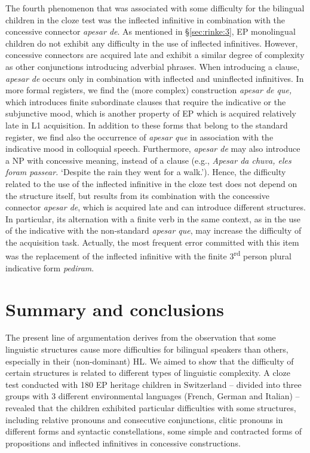 \documentclass[output=paper]{langscibook}
\begin{document}
The fourth phenomenon that was associated with some difficulty for the bilingual children in the cloze test was the inflected infinitive in combination with the concessive connector \textit{apesar de}. As mentioned in \S \ref{sec:rinke:3}, EP monolingual children do not exhibit any difficulty in the use of inflected infinitives. However, concessive connectors are acquired late and exhibit a similar degree of complexity as other conjunctions introducing adverbial phrases. When introducing a clause, \textit{apesar de} occurs only in combination with inflected and uninflected infinitives. In more formal registers, we find the (more complex) construction \textit{apesar de que,} which introduces finite subordinate clauses that require the indicative or the subjunctive mood, which is another property of EP which is acquired relatively late in L1 acquisition. In addition to these forms that belong to the standard register, we find also the occurrence of \textit{apesar que} in association with the indicative mood in colloquial speech. Furthermore, \textit{apesar de} may also introduce a NP with concessive meaning, instead of a clause (e.g., \textit{Apesar da chuva, eles foram passear.} `Despite the rain they went for a walk.'). Hence, the difficulty related to the use of the inflected infinitive in the cloze test does not depend on the structure itself, but results from its combination with the concessive connector \textit{apesar de}, which is acquired late and can introduce different structures. In particular, its alternation with a finite verb in the same context, as in the use of the indicative with the non-standard \textit{apesar que}, may increase the difficulty of the acquisition task. Actually, the most frequent error committed with this item was the replacement of the inflected infinitive with the finite 3\textsuperscript{rd} person plural indicative form \textit{pediram}.

\pagebreak
\section{Summary and conclusions}\label{sec:rinke:5}

The present line of argumentation derives from the observation that some linguistic structures cause more difficulties for bilingual speakers than others, especially in their (non-dominant) HL. We aimed to show that the difficulty of certain structures is related to different types of linguistic complexity. A cloze test conducted with 180 EP heritage children in Switzerland – divided into three groups with 3 different environmental languages (French, German and Italian) – revealed that the children exhibited particular difficulties with some structures, including relative pronouns and consecutive conjunctions, clitic pronouns in different forms and syntactic constellations, some simple and contracted forms of propositions and inflected infinitives in concessive constructions. 
\end{document}
